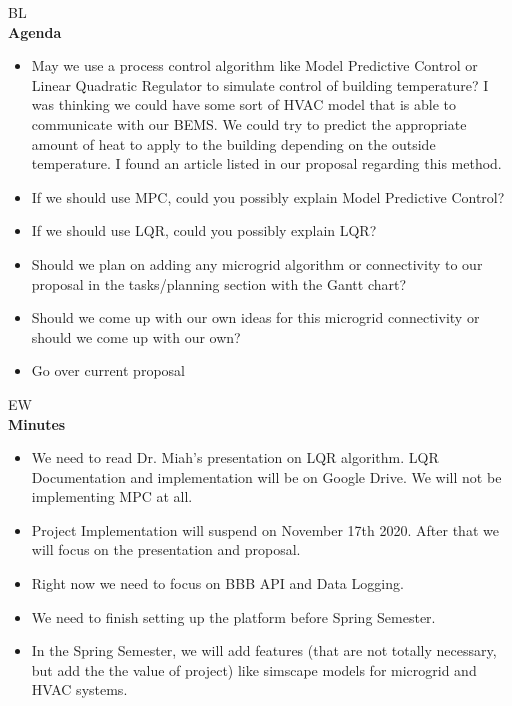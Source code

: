 \documentclass[fontsize=11pt, %
                             paper=letter, %
                             openany, %
                             captions=tableheading,
                             index=totoc,
                             hyperref]{labbook}
\begin{document}
BL\\
\textbf{Agenda}
\begin{itemize}
\item May we use a process control algorithm like Model Predictive Control or Linear Quadratic Regulator to simulate control of building temperature? I was thinking we could have some sort of HVAC model that is able to communicate with our BEMS. We could try to predict the appropriate amount of heat to apply to the building depending on the outside temperature. I found an article listed in our proposal regarding this method. 
\item If we should use MPC, could you possibly explain Model Predictive Control? 
\item If we should use LQR, could you possibly explain LQR?
\item Should we plan on adding any microgrid algorithm or connectivity to our proposal in the tasks/planning section with the Gantt chart?
\item Should we come up with our own ideas for this microgrid connectivity or should we come up with our own?
\item Go over current proposal
\end{itemize}

EW\\
\textbf{Minutes}
\begin{itemize}
\item We need to read Dr. Miah's presentation on LQR algorithm. LQR Documentation and implementation will be on Google Drive. We will not be implementing MPC at all.
\item Project Implementation will suspend on November 17th 2020. After that we will focus on the presentation and proposal.
\item Right now we need to focus on BBB API and Data Logging.
\item We need to finish setting up the platform before Spring Semester.
\item In the Spring Semester, we will add features (that are not totally necessary, but add the the value of project) like simscape models for microgrid and HVAC systems.
\end{itemize}
\end{document}
